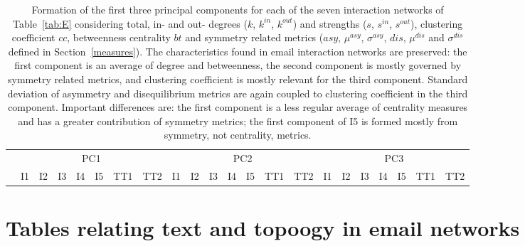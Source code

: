 \begin{table*}[!h]
	\caption{Formation of the first three principal components for each of the seven interaction networks of Table~\ref{tab:E} considering total, in- and out- degrees ($k$, $k^{in}$, $k^{out}$) and strengths ($s$, $s^{in}$, $s^{out}$), clustering coefficient $cc$, betweenness centrality $bt$ and symmetry related metrics ($asy$, $\mu^{asy}$, $\sigma^{asy}$, $dis$, $\mu^{dis}$ and $\sigma^{dis}$ defined in Section~\ref*{measures}).
	The characteristics found in email interaction networks are preserved: the first component is an average of degree and betweenness, the second component is mostly governed by symmetry related metrics, and clustering coefficient is mostly relevant for the third component.
Standard deviation of asymmetry and disequilibrium metrics are again coupled to clustering coefficient in the third component.
Important differences are: 
the first component is a less regular average of centrality measures and has a greater contribution of symmetry metrics;
the first component of I5 is formed mostly from symmetry, not centrality, metrics.}
	\footnotesize
	\begin{center}
		\begin{tabular}{| l ||  c |c |c |c |c | c | c || c | c | c | c | c | c | c || c |c |c |c |c | c | c |	}\cline{2-22}
			\multicolumn{1}{c|}{} & \multicolumn{7}{c||}{PC1}          & \multicolumn{7}{c||}{PC2} & \multicolumn{7}{c|}{PC3}  \\\cline{2-22}
			\multicolumn{1}{c|}{} & 
			I1 & I2 & I3 & I4 & I5 & TT1 & TT2 &
			I1 & I2 & I3 & I4 & I5 & TT1 & TT2 &
			I1 & I2 & I3 & I4 & I5 & TT1 & TT2 \\\hline
			
			\hline
		\end{tabular}
	\end{center}
	\label{tab:pcaE3}
\end{table*}



\chapter{Tables relating text and topoogy in email networks}\label{ap:texttop}
